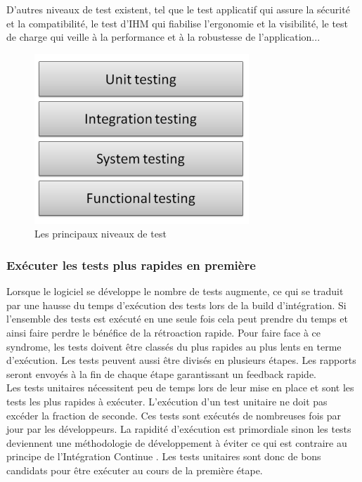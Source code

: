        D’autres niveaux de test existent, tel que le test applicatif qui assure la sécurité et la compatibilité, le test d’IHM qui fiabilise l’ergonomie et la visibilité, le test de charge qui veille à la performance et à la robustesse de l’application...

       \begin{figure}
         \begin{center}
           \includegraphics[scale=0.7]{images/testingLevels.png}
         \end{center}
         \caption{Les principaux niveaux de test}
         \label{Testing levels}
       \end{figure}

      \subsubsection{Exécuter les tests plus rapides en première}
      Lorsque le logiciel se développe le nombre de tests augmente, ce qui se traduit par une hausse du temps d’exécution des tests lors de la build d’intégration. Si l’ensemble des tests est exécuté en une seule fois cela peut prendre du temps et ainsi faire perdre le bénéfice de la rétroaction rapide. Pour faire face à ce syndrome, les tests doivent être classés du plus rapides au plus lents en terme d’exécution. Les tests peuvent aussi être divisés en plusieurs étapes. Les rapports seront envoyés à la fin de chaque étape garantissant un feedback rapide.\\

      Les tests unitaires nécessitent peu de temps lors de leur mise en place et sont les tests les plus rapides à exécuter. L’exécution d’un test unitaire ne doit pas excéder la fraction de seconde. Ces tests sont exécutés de nombreuses fois par jour par les développeurs. La rapidité d’exécution est primordiale sinon les tests deviennent une méthodologie de développement à éviter ce qui est contraire au principe de l’Intégration Continue \cite{Duv07}. Les tests unitaires sont donc de bons candidats pour être exécuter au cours de la première étape.\\

